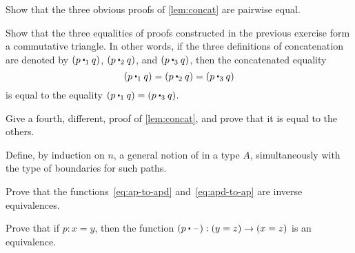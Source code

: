\documentclass[hott-all.tex]{subfiles}
\begin{document}
%
%
\begin{ex}\label{ex:basics:concat}
  Show that the three obvious proofs of \cref{lem:concat} are pairwise equal.
\end{ex}

\begin{ex}\label{ex:eq-proofs-commute}
  Show that the three equalities of proofs constructed in the previous exercise form a commutative triangle.
  In other words, if the three definitions of concatenation are denoted by $(p \mathbin{\ct_1} q)$, $(p\mathbin{\ct_2} q)$, and $(p\mathbin{\ct_3} q)$, then the concatenated equality
  \[(p\mathbin{\ct_1} q) = (p\mathbin{\ct_2} q) = (p\mathbin{\ct_3} q)\]
  is equal to the equality $(p\mathbin{\ct_1} q) = (p\mathbin{\ct_3} q)$.
\end{ex}

\begin{ex}\label{ex:fourth-concat}
  Give a fourth, different, proof of \cref{lem:concat}, and prove that it is equal to the others.
\end{ex}

\begin{ex}\label{ex:npaths}
  Define, by induction on $n$, a general notion of  in a type $A$, simultaneously with the type of boundaries for such paths.
\end{ex}
%
\begin{ex}\label{ex:ap-to-apd-equiv-apd-to-ap}
  Prove that the functions~\eqref{eq:ap-to-apd} and~\eqref{eq:apd-to-ap} are inverse equivalences.
\end{ex}
%
\begin{ex}\label{ex:equiv-concat}
  Prove that if $p:x=y$, then the function $(p\ct \blank):(y=z) \to (x=z)$ is an equivalence.
\end{ex}
\end{document}
